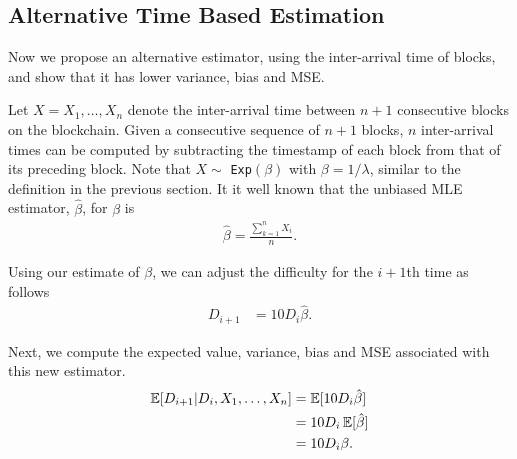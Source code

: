 \subsection{Alternative Time Based Estimation}\label{sec:time based}
Now we propose an alternative estimator, using the inter-arrival time of blocks, and show that it has lower variance, bias and MSE.


 Let $X = X_1, \ldots, X_n$ denote the inter-arrival time between $n+1$ consecutive blocks on the blockchain. Given a consecutive sequence of $n+1$ blocks, $n$ inter-arrival times can be computed by subtracting the timestamp of each block from that of its preceding block. Note that $X \sim$ \texttt{Exp}$(\beta)$ with $\beta = 1/\lambda$, similar to the definition in the previous section. It it well known that the unbiased MLE estimator, $\hat{\beta}$, for $\beta$ is
\begin{align}
\hat{\beta} = \frac{\sum_{k=1}^{n} X_i}{n}. \label{eq:beta-hat}
\end{align}

Using our estimate of $\beta$, we can adjust the difficulty for the $i+1$th time as follows 
\begin{align}
D_{i+1} &= 10 D_i \hat{\beta}.
\end{align}

\noindent Next, we compute the expected value, variance, bias and MSE associated with this new estimator. \\
\begin{align}
\operatorname{\mathbb{E}}[D_{i+1} | D_{i}, X_1, \dots, X_{n}] &= \operatorname{\mathbb{E}}[10 D_i \hat{\beta}] \\
&= 10 D_i \operatorname{\mathbb{E}}[\hat{\beta}] \\
&= 10 D_i\beta.
\end{align}

